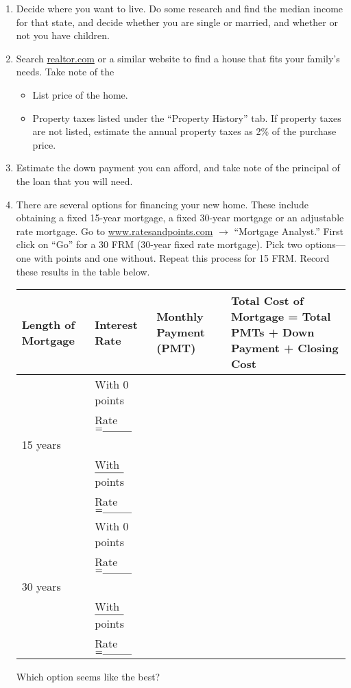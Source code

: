 \begin{exercises}
{\begin{enumerate}
\item Decide where you want to live.  Do some research and find the median income for that state, and decide whether you are single or married, and whether or not you have children.
\item Search \href{http://www.realtor.com}{realtor.com} or a similar website to find a house that fits your family's needs.  Take note of the
\begin{itemize}
\item List price of the home.
\item Property taxes listed under the ``Property History'' tab.  If property taxes are not listed, estimate the annual property taxes as 2\% of the purchase price.
\end{itemize}
\item Estimate the down payment you can afford, and take note of the principal of the loan that you will need.
\item There are several options for financing your new home.  These include obtaining a fixed 15-year mortgage, a fixed 30-year mortgage or an adjustable rate mortgage.  Go to \href{http://www.ratesandpoints.com}{www.ratesandpoints.com} $\longrightarrow$ ``Mortgage Analyst.''  First click on ``Go'' for a 30 FRM (30-year fixed rate mortgage).  Pick two options---one with points and one without.  Repeat this process for 15 FRM.  Record these results in the table below.
\begin{center}
\begin{tabular}{|p{0.75in} | p{1.5in} | p{2in} | p{1.5in}|}
\hline
\textbf{Length of Mortgage} & \textbf{Interest Rate} & \textbf{Monthly Payment (PMT)} & \textbf{Total Cost of Mortgage = Total PMTs + Down Payment + Closing Cost}\\
\hline
& With 0 points & & \\
& Rate $= \line(1,0){30}$ & & \\
15 years & & & \\
& With $\line(1,0){30}$ points & & \\
& Rate $= \line(1,0){30}$ & & \\
\hline
& With 0 points & & \\
& Rate $= \line(1,0){30}$ & & \\
30 years & & & \\
& With $\line(1,0){30}$ points & & \\
& Rate $= \line(1,0){30}$ & & \\
\hline
\end{tabular}
\end{center}
Which option seems like the best?
\end{enumerate}}


\end{exercises}
